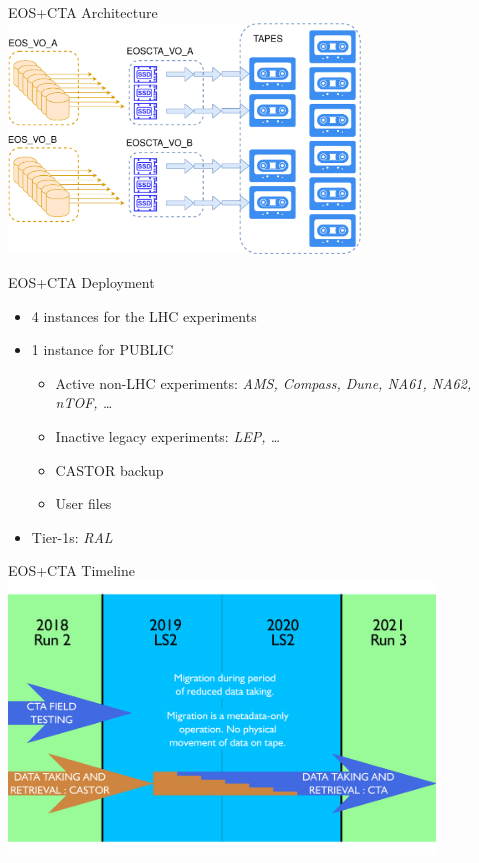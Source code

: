 \documentclass[aspectratio=1610]{beamer}
\begin{document}
\begin{frame}{EOS+CTA Architecture}
  \centering
  \includegraphics[width=0.7\textwidth]{images/upload_e764d94a4ee3ac79c328ea0d21a6a128.pdf}
\end{frame}

\begin{frame}{EOS+CTA Deployment}
   \begin{itemize}
      \item 4 instances for the LHC experiments
      \item 1 instance for PUBLIC
      \begin{itemize}
         \item Active non-LHC experiments: \textit{AMS, Compass, Dune, NA61, NA62, nTOF, \ldots}
         \item Inactive legacy experiments: \textit{LEP, \ldots}
         \item CASTOR backup
         \item User files
      \end{itemize}
   \item Tier-1s: \textit{RAL}
   \end{itemize}
\end{frame}

\begin{frame}{EOS+CTA Timeline}
  \centering
  \includegraphics[width=0.85\textwidth]{images/upload_0ae96233cb49710754263e2d780a20b6.pdf}
\end{frame}
\end{document}
